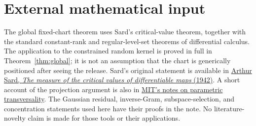 \documentclass[11pt,a4paper]{article}
\theoremstyle{definition}
\theoremstyle{definition}
\theoremstyle{remark}\newtheorem{remark}[theorem]{Remark}
\begin{document}
\section*{External mathematical input}
The global fixed-chart theorem uses Sard's critical-value theorem, together with the standard constant-rank and regular-level-set theorems of differential calculus. The application to the constrained random kernel is proved in full in Theorem~\ref{thm:global}; it is not an assumption that the chart is generically positioned after seeing the release. Sard's original statement is available in \href{https://projecteuclid.org/journals/bulletin-of-the-american-mathematical-society/volume-48/issue-12/The-measure-of-the-critical-values-of-differentiable-maps/bams/1183504867.pdf}{Arthur Sard, \emph{The measure of the critical values of differentiable maps} (1942)}. A short account of the projection argument is also in \href{https://math.mit.edu/classes/18.965/2014FA/class3.pdf}{MIT's notes on parametric transversality}. The Gaussian residual, inverse-Gram, subspace-selection, and concentration statements used here have their proofs in the note. No literature-novelty claim is made for those tools or their applications.
\end{document}
